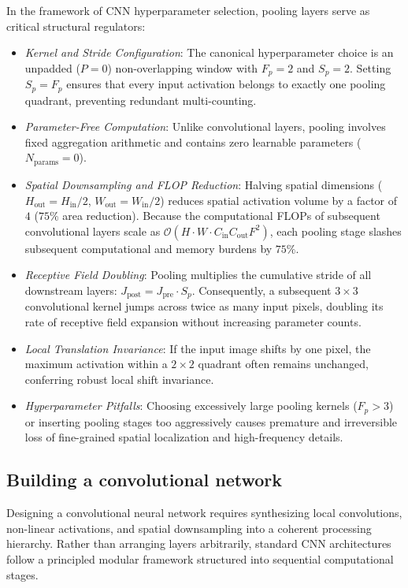 In the framework of CNN hyperparameter selection, pooling layers serve as critical structural regulators:
\begin{itemize}[leftmargin=*]
  \item \textit{Kernel and Stride Configuration}: The canonical hyperparameter choice is an unpadded ($P=0$) non-overlapping window with $F_p = 2$ and $S_p = 2$. Setting $S_p = F_p$ ensures that every input activation belongs to exactly one pooling quadrant, preventing redundant multi-counting.
  \item \textit{Parameter-Free Computation}: Unlike convolutional layers, pooling involves fixed aggregation arithmetic and contains zero learnable parameters ($N_{\text{params}} = 0$).
  \item \textit{Spatial Downsampling and FLOP Reduction}: Halving spatial dimensions ($H_{\text{out}} = H_{\text{in}}/2$, $W_{\text{out}} = W_{\text{in}}/2$) reduces spatial activation volume by a factor of $4$ ($75\%$ area reduction). Because the computational FLOPs of subsequent convolutional layers scale as $\mathcal{O}(H \cdot W \cdot C_{\text{in}} C_{\text{out}} F^2)$, each pooling stage slashes subsequent computational and memory burdens by $75\%$.
  \item \textit{Receptive Field Doubling}: Pooling multiplies the cumulative stride of all downstream layers: $J_{\text{post}} = J_{\text{pre}} \cdot S_p$. Consequently, a subsequent $3 \times 3$ convolutional kernel jumps across twice as many input pixels, doubling its rate of receptive field expansion without increasing parameter counts.
  \item \textit{Local Translation Invariance}: If the input image shifts by one pixel, the maximum activation within a $2 \times 2$ quadrant often remains unchanged, conferring robust local shift invariance.
  \item \textit{Hyperparameter Pitfalls}: Choosing excessively large pooling kernels ($F_p > 3$) or inserting pooling stages too aggressively causes premature and irreversible loss of fine-grained spatial localization and high-frequency details.
\end{itemize}

\subsection{Building a convolutional network}
\label{sec:building_a_convolutional_network}

Designing a convolutional neural network requires synthesizing local convolutions, non-linear activations, and spatial downsampling into a coherent processing hierarchy. Rather than arranging layers arbitrarily, standard CNN architectures follow a principled modular framework structured into sequential computational stages.

